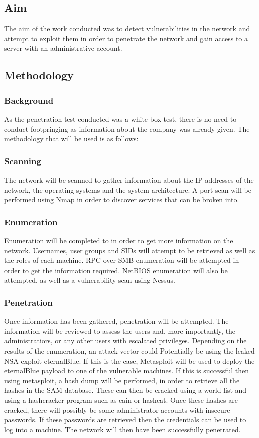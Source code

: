\documentclass[12pt,a4paper]{article}
\begin{document}
		\subsection{Aim}
		The aim of the work conducted was to detect vulnerabilities in the network and attempt to exploit them in order to penetrate the network and gain access to a server with an administrative account.

		\subsection{Methodology}
			\subsubsection{Background}
				As the penetration test conducted was a white box test, there is no need to conduct footpringing as information about the company was already given. The methodology that will be used is as follows:
			\subsubsection{Scanning}
				The network will be scanned to gather information about the IP addresses of the network, the operating systems and the system architecture. A port scan will be performed using Nmap in order to discover services that can be broken into.
			\subsubsection{Enumeration}
				Enumeration will be completed to in order to get more information on the network. Usernames, user groups and \acrshort{SID}s will attempt to be retrieved as well as the roles of each machine. \acrshort{RPC} over \acrshort{SMB} enumeration will be attempted in order to get the information required. \acrshort{NetBIOS} enumeration will also be attempted, as well as a vulnerability scan using Nessus.
			\subsubsection{Penetration}
				Once information has been gathered, penetration will be attempted. The information will be reviewed to assess the users and, more importantly, the administratiors, or any other users with escalated privileges. Depending on the results of the enumeration, an attack vector could Potentially be using the leaked NSA exploit eternalBlue. If this is the case, Metasploit will be used to deploy the eternalBlue payload to one of the vulnerable machines. If this is successful then using metasploit, a hash dump will be performed, in order to retrieve all the hashes in the \acrshort{SAM} database. These can then be cracked using a world list and using a hashcracker program such as cain or hashcat. Once these hashes are cracked, there will possibly be some administrator accounts with insecure passwords. If these passwords are retrieved then the credentials can be used to log into a machine. The network will then have been successfully penetrated.
\end{document}
